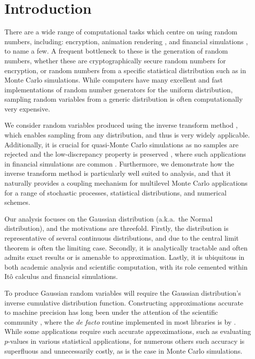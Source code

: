 \documentclass[manuscript,review]{acmart}
\begin{document}
\maketitle

\section{Introduction}
\label{sec:introduction}

There are a wide range of computational tasks which centre on using random numbers, including: encryption, animation rendering \citep{lee2017vectorized}, and financial simulations \citep{glasserman2013monte}, to name a few. A frequent bottleneck to these is the generation of random numbers, whether these are cryptographically secure random numbers for encryption, or random numbers from a specific statistical distribution such as in Monte Carlo simulations.  While computers have many excellent and fast implementations of random number generators for the uniform distribution, sampling random variables from a generic distribution is often computationally very expensive.

We consider random variables produced using the inverse transform method \citep{glasserman2013monte}, which enables sampling from any distribution, and thus is very widely applicable. Additionally, it is crucial for quasi-Monte Carlo simulations \citep{giles2009multilevel_qmc,lecuyer2016randomized} as no samples are rejected and the low-discrepancy property is preserved \citep{tezuka1995uniform}, where such applications in financial simulations are common \citep{joy1996quasi,xu2015high}. Furthermore, we demonstrate how the inverse transform method is particularly well suited to analysis, and that it naturally provides a coupling mechanism for multilevel Monte Carlo applications for a range of stochastic processes, statistical distributions, and numerical schemes. 

Our analysis focuses on the Gaussian distribution (a.k.a.\ the Normal distribution), and the motivations are threefold. Firstly, the distribution is representative of several continuous distributions, and due to the central limit theorem is often the limiting case. Secondly, it is analytically tractable and often admits exact results or is amenable to approximation. Lastly, it is ubiquitous in both academic analysis and scientific computation, with its role cemented within It\^{o} calculus and financial simulations. 

To produce Gaussian random variables will require the Gaussian distribution's inverse cumulative distribution function. Constructing approximations accurate to machine precision has long been under the attention of the scientific community \citep{hastings1955approximations,evans1974algorithm70,beasley1985percentage,wichura1988algorithm,marsaglia1994rapid,giles2011approximating}, where the \textit{de facto} routine implemented in most libraries is by \citet{wichura1988algorithm}. While some applications require such accurate approximations, such as evaluating $ p $-values in various statistical applications, for numerous others such accuracy is superfluous and unnecessarily costly, as is the case in Monte Carlo simulations. 
\end{document}
